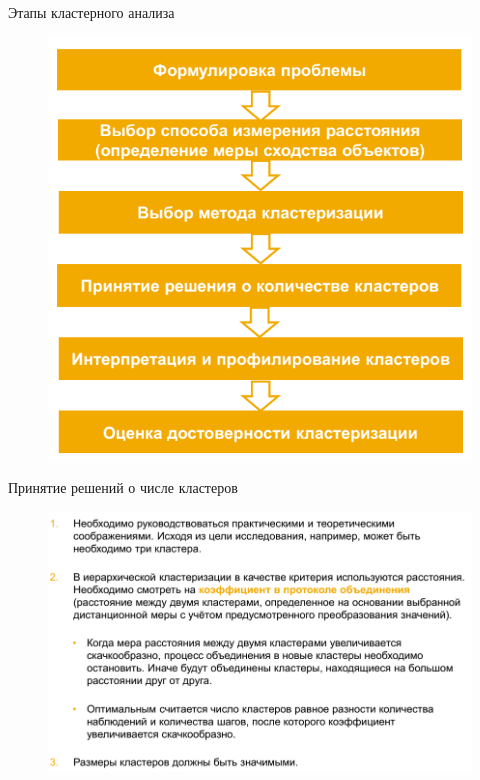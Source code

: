 \documentclass{beamer}
\begin{document}
\begin{frame}{Этапы кластерного анализа}
\begin{figure}[h]
\centering
\includegraphics[scale=0.5]{images/lec07-pic28.png}
\end{figure}
\end{frame}

\begin{frame}{Принятие решений о числе кластеров}
\begin{figure}[h]
\centering
\includegraphics[scale=0.5]{images/lec07-pic26.png}
\end{figure}
\end{frame}
\end{document}
